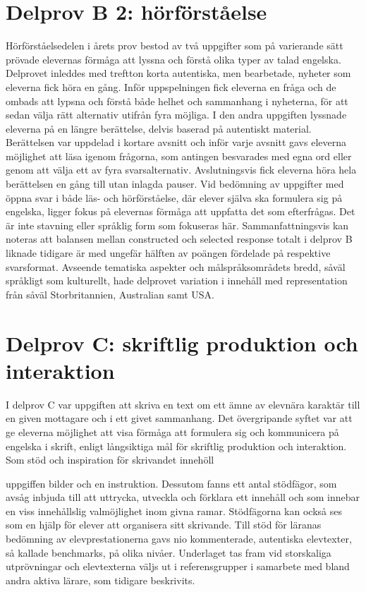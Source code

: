 \section*{Delprov B 2: hörförståelse}
Hörförståelsedelen i årets prov bestod av två uppgifter som på varierande sätt prövade elevernas förmåga att lyssna och förstå olika typer av talad engelska. Delprovet inleddes med treftton korta autentiska, men bearbetade, nyheter som eleverna fick höra en gång. Inför uppspelningen fick eleverna en fråga och de ombads att lypsna och förstå både helhet och sammanhang i nyheterna, för att sedan välja rätt alternativ utifrån fyra möjliga.
I den andra uppgiften lyssnade eleverna på en längre berättelse, delvis baserad på autentiskt material. Berättelsen var uppdelad i kortare avsnitt och inför varje avsnitt gavs eleverna möjlighet att läsa igenom frågorna, som antingen besvarades med egna ord eller genom att välja ett av fyra svarsalternativ. Avslutningsvis fick eleverna höra hela berättelsen en gång till utan inlagda pauser.
Vid bedömning av uppgifter med öppna svar i både läs- och hörförståelse, där elever själva ska formulera sig på engelska, ligger fokus på elevernas förmåga att uppfatta det som efterfrågas. Det är inte stavning eller språklig form som fokuseras här.
Sammanfattningsvis kan noteras att balansen mellan constructed och selected response totalt i delprov B liknade tidigare är med ungefär hälften av poängen fördelade på respektive svarsformat. Avseende tematiska aspekter och målspråksområdets bredd, såväl språkligt som kulturellt, hade delprovet variation i innehåll med representation från såväl Storbritannien, Australian samt USA.
\section*{Delprov C: skriftlig produktion och interaktion}
I delprov C var uppgiften att skriva en text om ett ämne av elevnära karaktär till en given mottagare och i ett givet sammanhang. Det övergripande syftet var att ge eleverna möjlighet att visa förmåga att formulera sig och kommunicera på engelska i skrift, enligt långsiktiga mål för skriftlig produktion och interaktion. Som stöd och inspiration för skrivandet innehöll

uppgiffen bilder och en instruktion. Dessutom fanns ett antal stödfägor, som avsåg inbjuda till att uttrycka, utveckla och förklara ett innehåll och som innebar en viss innehållslig valmöjlighet inom givna ramar. Stödfägorna kan också ses som en hjälp för elever att organisera sitt skrivande.
Till stöd för läranas bedömning av elevprestationerna gavs nio kommenterade, autentiska elevtexter, så kallade benchmarks, på olika nivåer. Underlaget tas fram vid storskaliga utprövningar och elevtexterna väljs ut i referensgrupper i samarbete med bland andra aktiva lärare, som tidigare beskrivits.
